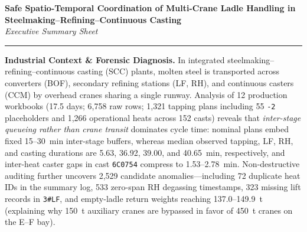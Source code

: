\documentclass[11pt,a4paper]{article}
\begin{document}
\thispagestyle{empty}
\begin{center}
  {\Large \textbf{Safe Spatio-Temporal Coordination of Multi-Crane Ladle Handling in Steelmaking--Refining--Continuous Casting}}\\[0.25em]
  {\normalsize \textit{Executive Summary Sheet}}
\end{center}
\vspace{0.1em}
\hrule
\vspace{0.4em}
{\small
\noindent\textbf{Industrial Context \& Forensic Diagnosis.}
In integrated steelmaking--refining--continuous casting (SCC) plants, molten steel is transported across converters (BOF), secondary refining stations (LF, RH), and continuous casters (CCM) by overhead cranes sharing a single runway. Analysis of 12 production workbooks (17.5 days; 6,758 raw rows; 1,321 tapping plans including 55 \texttt{-2} placeholders and 1,266 operational heats across 152 casts) reveals that \emph{inter-stage queueing rather than crane transit} dominates cycle time: nominal plans embed fixed 15--30~min inter-stage buffers, whereas median observed tapping, LF, RH, and casting durations are 5.63, 36.92, 39.00, and 40.65~min, respectively, and inter-heat caster gaps in cast \texttt{6C0754} compress to 1.53--2.78~min. Non-destructive auditing further uncovers 2,529 candidate anomalies---including 72 duplicate heat IDs in the summary log, 533 zero-span RH degassing timestamps, 323 missing lift records in \texttt{3\#LF}, and empty-ladle return weights reaching 137.0--149.9~t (explaining why 150~t auxiliary cranes are bypassed in favor of 450~t cranes on the E--F bay).

}
\end{document}
